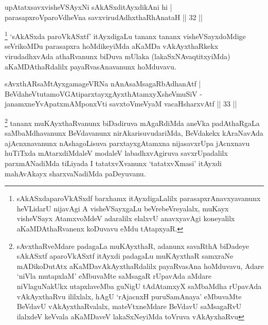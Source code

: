 
\begin{shl}
upAtatxsavxvisheVSAyxNi sAkASxditAyxdikAni hi |\\
parasapxroVparoVdheVna savxvirudAdhxthaRhAnataH \hfill || 32 ||
\end{shl}

\begin{artha}
\footnote{sAkASxdaparoVkASxdf barxhamx itAyxdigaLalilx parasapxrAnavxyavanunx heVLidarU nijavAgi A visheVSayxgaLu beVrebeVreyalalx, muKayx visheVSayx AtamxvoMdeV adaralilx elalxvU anavxyavAgi koneyalilx aKaMDAthaRvanenx koDuvavu eMdu tAtapxyaR.} `sAkASxda paroVkASxtf' itAyxdigaLu tananx tananx visheVSayxdoMdige seVrikoMDu parasapxra hoMdikeyiMda aKaMDa vAkAyxthaRkekx virudadhxvAda athaRvanunx biDuva mUlaka (lakaSxNAvaqtitxyiMda) aKaMDAthaRdalilx payaRvasAnavanunx hoMduvavu.
\end{artha}


\begin{shl}
sAvxthARsaMtAyxgamageVRNa nAnAsaMsagaRbAdhanAtf |\\
BeVdaheVtutamoVGAtiparxtayxgAyxthAtamxyXsheVmuSiV -\\
 janamxneYvA\s \s patxmAMponxVti savxtoV\s meVyaM vacaHsharxvAtf \hfill || 33 || 
\end{shl}

\begin{artha}
\footnote{sAvxthaRveMdare padagaLa muKAyxthaR, adanunx savaRthA biDadeye sAkASxtf aparoVkASxtf itAyxdi padagaLu muKAyxthaR samxraNe mADikoDutAtx aKaMDavAkAyxthaRdalilx payaRvasAna hoMduvavu, Adare `niVla mutapxlaM' eMbuvaMte saMsagaR rUpavAda aMdare niVlaguNakUkx utapxlaveMba guNigU tAdAtamxyX saMbaMdha rUpavAda vAkAyxthaRvu ililxlalx, hAgU `rAjacnxH puruSamAnaya' eMbuvaMte BeVdavU vAkAyxthaRvalalx, mateVtxneMdare BeVdavU saMsagaRvU ilalxdeV keVvala aKaMDaveV lakaSxNeyiMda toVruva vAkAyxhaRvu} tananx muKAyxthaRvanunx biDadiruva mAgaRdiMda aneVka padAthaRgaLa saMbaMdhavanunx BeVdavanunx nirAkarisuvudariMda, BeVdakekx kAraNavAda ajAcnxnavanunx nAshagoLisuva parxtayxgAtamxna nijasavxrUpa jAcnxnavu huTiTxda mAtarxdiMdaleV modaleV labadhxvAgiruva savxrUpadalilx parxmANadiMda tiLiyada I tatatxvXvanunx `tatatxvXmasi' itAyxdi mahAvAkayx sharxvaNadiMda paDeyuvanu.
\end{artha}

